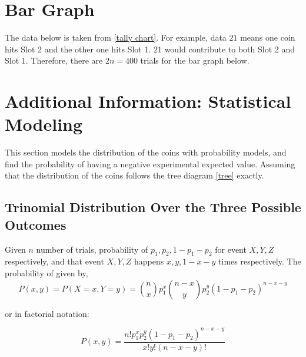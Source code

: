 \documentclass{article}
\begin{document}
\section{Bar Graph}
The data below is taken from \ref{tally chart}. For example, data $21$ means one coin hits Slot 2 and the other one hits Slot 1. $21$ would contribute to both Slot 2 and Slot 1. Therefore, there are $2n=400$ trials for the bar graph below.  


\begin{center}
\end{center}








\pagebreak
\section{Additional Information: Statistical Modeling}
This section models the distribution of the coins with probability models, and find the probability of having a negative experimental expected value. Assuming that the distribution of the coins follows the tree diagram \ref{tree} exactly. 



\subsection{Trinomial Distribution Over the Three Possible Outcomes}
\begin{definition}
    Given $n$ number of trials, probability of $p_1,p_2,1-p_1-p_2$ for event $X,Y,Z$ respectively, and that event $X,Y,Z$ happens $x,y,1-x-y$ times respectively. The probability of given by,
    \[P(x, y)=P(X=x, Y=y)={n\choose x}p_1^x{n-x\choose y}p_2^y\left(1-p_1-p_2\right)^{n-x-y}\]

    or in factorial notation:
    
    
    \[P(x,y)=\frac{n ! p_1^x p_2^y\left(1-p_1-p_2\right)^{n-x-y}}{x ! y !(n-x-y) !}\]
\end{definition}
\end{document}
